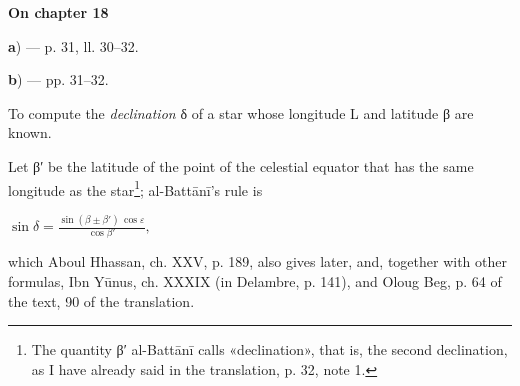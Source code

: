 \documentclass[11pt]{article}
\newcommand{\UnitHead}[2]{\par\setcounter{footnoteT}{0}\needspace{8\baselineskip}\bigskip\pdfbookmark[1]{#1}{unit-#2}\hypertarget{EN-#2}{}%
 {\large\bfseries\interlinepenalty=10000 #1\par}\nobreak\medskip}
\begin{document}
\UnitHead{On chapter 18}{A18}
\par\begin{center}\textbf{a}) — p. 31, ll. 30–32.\end{center}
\par [«\emph{But the stars on either side}» etc. — The whole sentence is very obscure. The declination is greater or smaller than the latitude in various ways in the different regions of the sky, and it is not understood how it could be useful to take the sum or the difference of two quantities which, as the author himself says just below, are counted on two different circles. Either it is a gloss of a very unskilled reader, or a fragment of a fuller passage that it is now impossible to restore. Perhaps the arc that we shall call {\greekfont β}′ in what follows was defined in this place; but it is a mere conjecture. — Schiaparelli.]\par
\par\begin{center}\textbf{b}) — pp. 31–32.\end{center}
\par To compute the \emph{declination} {\greekfont δ} of a star whose longitude L and latitude {\greekfont β} are known.\par
\par Let {\greekfont β}′ be the latitude of the point of the celestial equator that has the same longitude as the star\footnote{The quantity {\greekfont β}′ al-Battānī calls «declination», that is, the second declination, as I have already said in the translation, p. 32, note 1.}; al-Battānī's rule is \par\noindent\hspace*{1.5em}$\displaystyle \sin\delta = \frac{\sin(\beta \pm \beta')\,\cos\varepsilon}{\cos\beta'},$\par which Aboul Hhassan, ch. XXV, p. 189, also gives later, and, together with other formulas, Ibn Yūnus, ch. XXXIX (in Delambre, p. 141), and Oloug Beg, p. 64 of the text, 90 of the translation.\par
\begin{center}\end{center}
\end{document}
